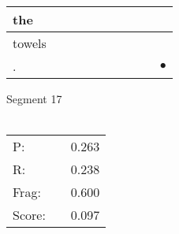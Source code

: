 \documentclass[landscape]{article}
\newcommand{\ssp}{\hspace{2pt}}
\newcommand{\mex}{\cellcolor{g}$\bullet$}
\begin{document}
\begin{tabular}{|l|p{10pt}|p{10pt}|p{10pt}|p{10pt}|p{10pt}|p{10pt}|p{10pt}|p{10pt}|p{10pt}|}
\hline
\ssp the \ssp&\hspace{2pt}&\hspace{2pt}&\hspace{2pt}&\hspace{2pt}&\hspace{2pt}&\hspace{2pt}&\hspace{2pt}&\hspace{2pt}&\hspace{2pt}\\
\hline
\ssp towels \ssp&\hspace{2pt}&\hspace{2pt}&\hspace{2pt}&\hspace{2pt}&\hspace{2pt}&\hspace{2pt}&\hspace{2pt}&\hspace{2pt}&\hspace{2pt}\\
\hline
\ssp \cellcolor{ref8}. \ssp&\hspace{2pt}&\hspace{2pt}&\hspace{2pt}&\hspace{2pt}&\hspace{2pt}&\hspace{2pt}&\hspace{2pt}&\hspace{2pt}&\hspace{2pt}\mex\\
\hline
\end{tabular}

\vspace{6pt}
\noindent Segment 17\\\\
\noindent\begin{tabular}{lm{12pt}r}
\hline
P:&&0.263\\
R:&&0.238\\
Frag:&&0.600\\
Score:&&0.097\\
\end{tabular}

\newpage
\end{document}
